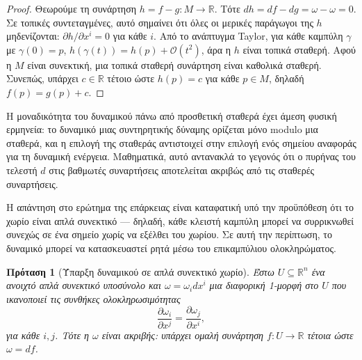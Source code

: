 \documentclass[11pt,a4paper,twoside,openright]{book}
\newtheorem{proposition}[lemma]{Πρόταση}
\begin{document}
\begin{proof}
Θεωρούμε τη συνάρτηση $h = f - g: M \to \mathbb{R}$. Τότε $dh = df - dg = \omega - \omega = 0$. Σε τοπικές συντεταγμένες, αυτό σημαίνει ότι όλες οι μερικές παράγωγοι της $h$ μηδενίζονται: $\partial h / \partial x^i = 0$ για κάθε $i$. Από το ανάπτυγμα Taylor, για κάθε καμπύλη $\gamma$ με $\gamma(0) = p$, $h(\gamma(t)) = h(p) + \mathcal{O}(t^2)$, άρα η $h$ είναι τοπικά σταθερή. Αφού η $M$ είναι συνεκτική, μια τοπικά σταθερή συνάρτηση είναι καθολικά σταθερή. Συνεπώς, υπάρχει $c \in \mathbb{R}$ τέτοιο ώστε $h(p) = c$ για κάθε $p \in M$, δηλαδή $f(p) = g(p) + c$.
\end{proof}

Η μοναδικότητα του δυναμικού πάνω από προσθετική σταθερά έχει άμεση φυσική ερμηνεία: το δυναμικό μιας συντηρητικής δύναμης ορίζεται μόνο modulo μια σταθερά, και η επιλογή της σταθεράς αντιστοιχεί στην επιλογή ενός σημείου αναφοράς για τη δυναμική ενέργεια. Μαθηματικά, αυτό αντανακλά το γεγονός ότι ο πυρήνας του τελεστή $d$ στις βαθμωτές συναρτήσεις αποτελείται ακριβώς από τις σταθερές συναρτήσεις.

Η απάντηση στο ερώτημα της επάρκειας είναι καταφατική υπό την προϋπόθεση ότι το χωρίο είναι απλά συνεκτικό --- δηλαδή, κάθε κλειστή καμπύλη μπορεί να συρρικνωθεί συνεχώς σε ένα σημείο χωρίς να εξέλθει του χωρίου. Σε αυτή την περίπτωση, το δυναμικό μπορεί να κατασκευαστεί ρητά μέσω του επικαμπύλιου ολοκληρώματος.

\begin{proposition}[Ύπαρξη δυναμικού σε απλά συνεκτικό χωρίο]
Έστω $U \subseteq \mathbb{R}^n$ ένα ανοιχτό απλά συνεκτικό υποσύνολο και $\omega = \omega_i dx^i$ μια διαφορική 1-μορφή στο $U$ που ικανοποιεί τις συνθήκες ολοκληρωσιμότητας
\[
\frac{\partial \omega_i}{\partial x^j} = \frac{\partial \omega_j}{\partial x^i},
\]
για κάθε $i, j$. Τότε η $\omega$ είναι ακριβής: υπάρχει ομαλή συνάρτηση $f: U \to \mathbb{R}$ τέτοια ώστε $\omega = df$.
\end{proposition}
\end{document}
